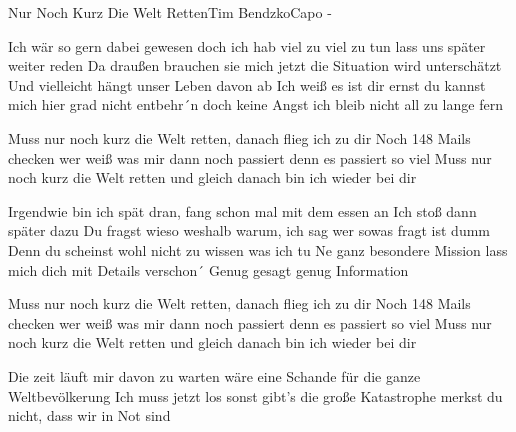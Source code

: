 \begin{song}{Nur Noch Kurz Die Welt Retten}{Tim Bendzko}{Capo -}


Ich wär so gern dabei gewesen doch ich hab viel zu viel zu tun 
lass uns später weiter reden 
Da draußen brauchen sie mich jetzt die Situation wird unterschätzt
Und vielleicht hängt unser Leben davon ab 
Ich weiß es ist dir ernst du kannst mich hier grad nicht entbehr´n 
doch keine Angst ich bleib nicht all zu lange fern

Muss nur noch kurz die Welt retten, danach flieg ich zu dir
Noch 148 Mails checken wer weiß was mir dann noch passiert 
denn es passiert so viel
Muss nur noch kurz die Welt retten
und gleich danach bin ich wieder bei dir

Irgendwie bin ich spät dran, fang schon mal mit dem essen an
Ich stoß dann später dazu
Du fragst wieso weshalb warum, ich sag wer sowas fragt ist dumm
Denn du scheinst wohl nicht zu wissen was ich tu
Ne ganz besondere Mission lass mich dich mit Details verschon´
Genug gesagt genug Information

Muss nur noch kurz die Welt retten, danach flieg ich zu dir
Noch 148 Mails checken wer weiß was mir dann noch passiert 
denn es passiert so viel
Muss nur noch kurz die Welt retten
und gleich danach bin ich wieder bei dir

Die zeit läuft mir davon zu warten wäre eine Schande
für die ganze Weltbevölkerung
Ich muss jetzt los sonst gibt’s die große Katastrophe
merkst du nicht, dass wir in Not sind


\end{song}
